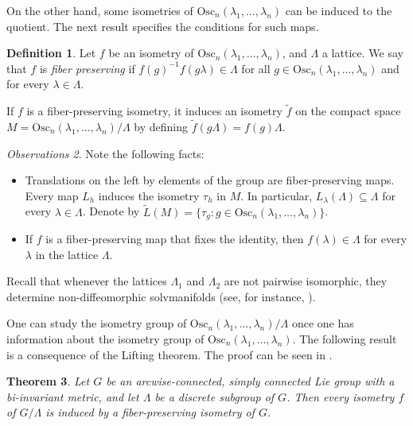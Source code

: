 \documentclass[12pt]{amsart}
\theoremstyle{plain}
\newtheorem{thm}{Theorem}[section]
\theoremstyle{definition}
\newtheorem{defn}[thm]{Definition}
\theoremstyle{remark}
\newtheorem{obs}[thm]{Observations}
\begin{document}
On the other hand, some isometries of \( \text{Osc}_n(\lambda_1, \ldots, \lambda_n) \) can be induced to the quotient. The next result specifies the conditions for such maps.

\begin{defn}
    Let \( f \) be an isometry of \( \text{Osc}_n(\lambda_1, \ldots, \lambda_n) \), and \( \Lambda \) a lattice. We say that \( f \) is \emph{fiber preserving} if \( f(g)^{-1} f(g\lambda) \in \Lambda \) for all \( g \in \text{Osc}_n(\lambda_1, \ldots, \lambda_n) \) and for every \( \lambda \in \Lambda \).
\end{defn}

If \( f \) is a fiber-preserving isometry, it induces an isometry \( \tilde{f} \) on the compact space \( M = \text{Osc}_n(\lambda_1, \ldots, \lambda_n)/\Lambda \) by defining \( \tilde{f}(g\Lambda) = f(g)\Lambda \).

\begin{obs}
    Note the following facts:
    \begin{itemize}
        \item Translations on the left by elements of the group are fiber-preserving maps. Every map \( L_h \) induces the isometry \( \tau_h \) in \( M \). In particular, \( L_{\lambda}(\Lambda) \subseteq \Lambda \) for every \( \lambda \in \Lambda \). Denote by \( \tilde{L}(M) = \{\tau_g : g \in \text{Osc}_n(\lambda_1, \ldots, \lambda_n)\} \).
        \item If \( f \) is a fiber-preserving map that fixes the identity, then \( f(\lambda) \in \Lambda \) for every \( \lambda \) in the lattice \( \Lambda \).
    \end{itemize}
\end{obs}

Recall that whenever the lattices \( \Lambda_1 \) and \( \Lambda_2 \) are not pairwise isomorphic, they determine non-diffeomorphic solvmanifolds (see, for instance, \cite{Ra}).

One can study the isometry group of \( \text{Osc}_n(\lambda_1, \ldots, \lambda_n)/\Lambda \) once one has information about the isometry group of \( \text{Osc}_n(\lambda_1, \ldots, \lambda_n) \). The following result is a consequence of the Lifting theorem. The proof can be seen in \cite{BOV}.

\begin{thm}
    Let \( G \) be an arcwise-connected, simply connected Lie group with a bi-invariant metric, and let \( \Lambda \) be a discrete subgroup of \( G \). Then every isometry \( f \) of \( G/\Lambda \) is induced by a fiber-preserving isometry of \( G \).
\end{thm}
\end{document}
